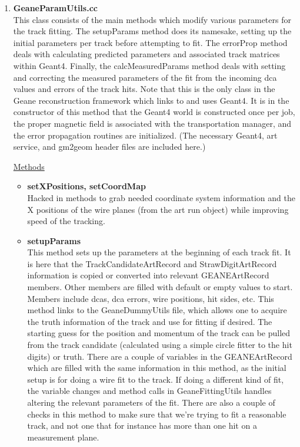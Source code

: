 \begin{enumerate}
\begin{itemize}
        \end{itemize}

      \item{\bf{GeaneParamUtils.cc}} \\
      \label{sec:GeaneParamUtils}
      This class consists of the main methods which modify various parameters for the track fitting. The setupParams method does its namesake, setting up the initial parameters per track before attempting to fit. The errorProp method deals with calculating predicted parameters and associated track matrices within Geant4. Finally, the calcMeasuredParams method deals with setting and correcting the measured parameters of the fit from the incoming dca values and errors of the track hits. Note that this is the only class in the Geane reconstruction framework which links to and uses Geant4. It is in the constructor of this method that the Geant4 world is constructed once per job, the proper magnetic field is associated with the transportation manager, and the error propagation routines are initialized. (The necessary Geant4, art service, and gm2geom header files are included here.)

      \underline{Methods}

        \begin{itemize}

          \item{\bf{setXPositions, setCoordMap}} \\
          Hacked in methods to grab needed coordinate system information and the X positions of the wire planes (from the art run object) while improving speed of the tracking.

          \item{\bf{setupParams}} \\
          This method sets up the parameters at the beginning of each track fit. It is here that the TrackCandidateArtRecord and StrawDigitArtRecord information is copied or converted into relevant GEANEArtRecord members. Other members are filled with default or empty values to start. Members include dcas, dca errors, wire positions, hit sides, etc. This method links to the GeaneDummyUtils file, which allows one to acquire the truth information of the track and use for fitting if desired. The starting guess for the position and momentum of the track can be pulled from the track candidate (calculated using a simple circle fitter to the hit digits) or truth. There are a couple of variables in the GEANEArtRecord which are filled with the same information in this method, as the initial setup is for doing a wire fit to the track. If doing a different kind of fit, the variable changes and method calls in GeaneFittingUtils handles altering the relevant parameters of the fit. There are also a couple of checks in this method to make sure that we're trying to fit a reasonable track, and not one that for instance has more than one hit on a measurement plane.


\end{itemize}
\end{enumerate}
